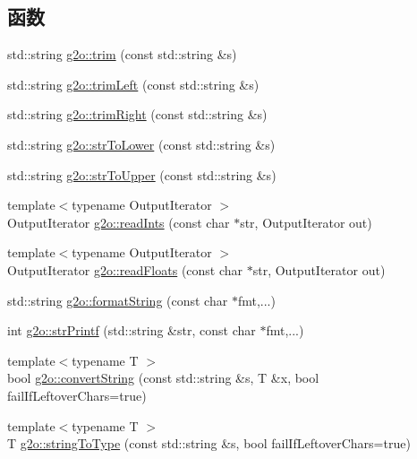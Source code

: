 \subsection*{函数}
\begin{DoxyCompactItemize}
\item 
std\-::string \hyperlink{group__utils_ga437d185a62afe16a99f27f3b12e108d7}{g2o\-::trim} (const std\-::string \&s)
\item 
std\-::string \hyperlink{group__utils_gad2277aa8d0784f7001f7f27396d59f98}{g2o\-::trim\-Left} (const std\-::string \&s)
\item 
std\-::string \hyperlink{group__utils_ga7305cbf5d345c0e352ac2baa93b7d30a}{g2o\-::trim\-Right} (const std\-::string \&s)
\item 
std\-::string \hyperlink{group__utils_ga18235ef006dc52e266590591f895157d}{g2o\-::str\-To\-Lower} (const std\-::string \&s)
\item 
std\-::string \hyperlink{group__utils_ga70dfb4dd2aeae37635cf2b5bef6321a9}{g2o\-::str\-To\-Upper} (const std\-::string \&s)
\item 
{\footnotesize template$<$typename Output\-Iterator $>$ }\\Output\-Iterator \hyperlink{group__utils_gae501003a8f6b60afb846857fdb82174d}{g2o\-::read\-Ints} (const char $\ast$str, Output\-Iterator out)
\item 
{\footnotesize template$<$typename Output\-Iterator $>$ }\\Output\-Iterator \hyperlink{group__utils_ga88353c6cfc2e519df07814ca577e71ec}{g2o\-::read\-Floats} (const char $\ast$str, Output\-Iterator out)
\item 
std\-::string \hyperlink{group__utils_gadc1d37473e0e8c6a73fb46b19239d2d1}{g2o\-::format\-String} (const char $\ast$fmt,...)
\item 
int \hyperlink{group__utils_gacce5cae59e8c97bf3f4ff581c6534d03}{g2o\-::str\-Printf} (std\-::string \&str, const char $\ast$fmt,...)
\item 
{\footnotesize template$<$typename T $>$ }\\bool \hyperlink{group__utils_ga599c46f6984e9a2147fac39324e9fadc}{g2o\-::convert\-String} (const std\-::string \&s, T \&x, bool fail\-If\-Leftover\-Chars=true)
\item 
{\footnotesize template$<$typename T $>$ }\\T \hyperlink{group__utils_ga9dac39a213d269b8d68fb698bf82873a}{g2o\-::string\-To\-Type} (const std\-::string \&s, bool fail\-If\-Leftover\-Chars=true)
\item 

\end{DoxyCompactItemize}
